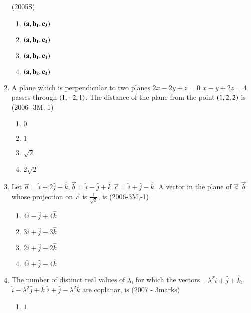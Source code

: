\documentclass[journal,12pt,onecolumn]{IEEEtran}
\theoremstyle{remark}
\begin{document}
\begin{enumerate}
    \hfill{(2005S)}
    \begin{multicols}{2}
    \begin{enumerate}
    \item $\left(\mathbf{a}, \mathbf{b_1}, \mathbf{c_3}\right)$
    \item $\left(\mathbf{a}, \mathbf{b_1}, \mathbf{c_2}\right)$
    \item $\left(\mathbf{a}, \mathbf{b_1}, \mathbf{c_1}\right)$
    \item $\left(\mathbf{a}, \mathbf{b_2}, \mathbf{c_2}\right)$
    \end{enumerate}
    \end{multicols}
    \item A plane which is perpendicular to two planes $2x-2y+z=0$  $x-y+2z=4$ passes through $\left(1,-2,1\right)$. The distance of the plane from the point $\left(1,2,2\right)$ is
    \hfill{(2006 -3M,-1)}
    \begin{multicols}{2} 
    \begin{enumerate}
    \item $0$
    \item $1$
    \item $\sqrt{2}$
    \item $2\sqrt{2}$
    \end{enumerate}
    \end{multicols}
    \item Let $\vec{a} = \hat{i} + 2\hat{j} + \hat{k}, \vec{b} = \hat{i}-\hat{j}+\hat{k}$  $\vec{c}= \hat{i}+\hat{j}-\hat{k}$. A vector in the plane of $\vec{a}$  $\vec{b}$ whose projection on $\vec{c}$ is $\frac{1}{\sqrt{3}}$, is
    \hfill{(2006-3M,-1)}
    \begin{enumerate}
    \item $4\hat{i} - \hat{j} + 4\hat{k}$
    \item $3\hat{i} + \hat{j} - 3\hat{k}$
    \item $2\hat{i} + \hat{j} - 2\hat{k}$
    \item $4\hat{i} + \hat{j} - 4\hat{k}$
    \end{enumerate}
    \item The number of distinct real values of $\lambda$, for which the vectors $-\lambda^{2}\hat{i} + \hat{j} + \hat{k}$, $\hat{i} - \lambda^{2}\hat{j} + \hat{k}$  $\hat{i} + \hat{j} - \lambda^{2}\hat{k}$ are coplanar, is
    \hfill{(2007 - 3marks)}
    \begin{multicols}{2} 
    \begin{enumerate}
    \item $1$

\end{enumerate}
\end{multicols}
\end{enumerate}
\end{document}
